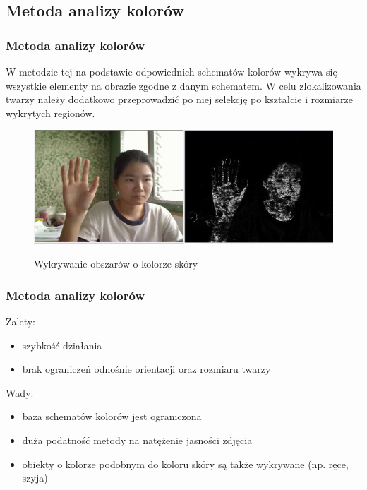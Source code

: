 \documentclass[xcolor=table]{beamer}
\begin{document}
\subsection{Metoda analizy kolorów}
\begin{frame}
  \frametitle{Metoda analizy kolorów}

W metodzie tej na podstawie odpowiednich schematów kolorów wykrywa się wszystkie elementy na obrazie zgodne z danym schematem. W celu zlokalizowania twarzy należy dodatkowo przeprowadzić po niej selekcję po kształcie i rozmiarze wykrytych regionów.

\begin{figure}
  {\includegraphics[scale=0.4]{skin_detection.jpg}}
\caption{Wykrywanie obszarów o kolorze skóry}
\end{figure}

\end{frame}

\begin{frame}
  \frametitle{Metoda analizy kolorów}

Zalety:
\begin{itemize}
	\item szybkość działania
	\item brak ograniczeń odnośnie orientacji oraz rozmiaru twarzy
\end{itemize}

\vspace{10pt}
 {
Wady:
\begin{itemize}
\item baza schematów kolorów jest ograniczona
\item duża podatność metody na natężenie jasności zdjęcia
\item obiekty o kolorze podobnym do koloru skóry są także wykrywane (np. ręce, szyja)
\end{itemize}
}

\end{frame}
\end{document}
